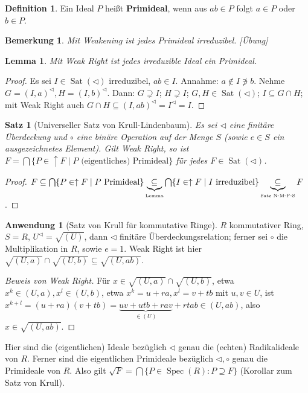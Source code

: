 \documentclass[headsepline=true,DIV=11]{scrartcl}
\newtheorem*{theorem}{Satz}
\newtheorem*{lemma}{Lemma}
\newtheorem*{remark}{Bemerkung}
\theoremstyle{definition}
\newtheorem*{definition}{Definition}
\newcommand{\Spec}{\operatorname{Spec}}
\newcommand{\Sat}{\operatorname{Sat}}
\begin{document}
\begin{definition}
  Ein Ideal $P$ heißt {\bf Primideal}, wenn aus $ab\in P$ folgt $a\in P$ oder $b\in P$.
\end{definition}

\begin{remark}
  Mit Weakening ist jedes Primideal irreduzibel. [Übung]
\end{remark}

\begin{lemma}
  Mit Weak Right ist jedes irreduzible Ideal ein Primideal.
\end{lemma}

\begin{proof}
  Es sei $I\in\Sat(\lhd)$ irreduzibel, $ab\in I$. Annahme: $a\not\in I\not\ni b$. Nehme $G=(I,a)^\lhd,H=(I,b)^\lhd$. Dann: $G\supsetneq I$;
  $H\supsetneq I$; $G,H\in\Sat(\lhd)$; $I\subseteq G\cap H$; mit Weak Right auch $G\cap H\subseteq (I,ab)^\lhd=I^\lhd=I$.
\end{proof}

\begin{theorem}[Universeller Satz von Krull-Lindenbaum]
  Es sei $\lhd$ eine finitäre Überdeckung und $\circ$ eine binäre Operation auf der Menge $S$ (sowie $e\in S$ ein ausgezeichnetes Element). Gilt Weak
  Right, so ist $F=\bigcap\{P\in\uparrow F\mid P\mbox{ (eigentliches) Primideal}\}$ für jedes $F\in\Sat(\lhd)$.
\end{theorem}

\begin{proof}
  $F\subseteq\bigcap\{P\in\uparrow F\mid P\mbox{ Primideal}\}\underbrace{\subseteq}_{\mbox{\tiny Lemma}}\bigcap\{I\in\uparrow F\mid I\mbox{
    irreduzibel}\}\underbrace{\subseteq}_{\mbox{\tiny Satz N-M-F-S}} F$.
\end{proof}

{\bf Anwendung 1} (Satz von Krull für kommutative Ringe). $R$ kommutativer Ring, $S=R$, $U^\lhd=\sqrt{(U)}$, dann $\lhd$ finitäre
Überdeckungsrelation; ferner sei $\circ$ die Multiplikation in $R$, sowie $e=1$. Weak Right ist hier
$\sqrt{(U,a)}\cap\sqrt{(U,b)}\subseteq\sqrt{(U,ab)}$.

\begin{proof}[Beweis von Weak Right]
  Für $x\in\sqrt{(U,a)}\cap\sqrt{(U,b)}$, etwa $x^k\in(U,a),x^l\in(U,b)$, etwa $x^k=u+ra,x^l=v+tb$ mit $u,v\in U$, ist
  $x^{k+l}=(u+ra)(v+tb)=\underbrace{uv+utb+rav}_{\in(U)}+rtab\in(U,ab)$, also $x\in\sqrt{(U,ab)}$.
\end{proof}

Hier sind die (eigentlichen) Ideale bezüglich $\lhd$ genau die (echten) Radikalideale von $R$. Ferner sind die eigentlichen Primideale bezüglich
$\lhd,\circ$ genau die Primideale von $R$. Also gilt $\sqrt{F}=\bigcap\{P\in\Spec(R):P\supseteq F\}$ (Korollar zum Satz von Krull).
\end{document}
